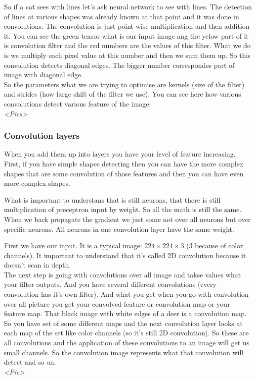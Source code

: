 So if a cat sees with lines let's ask neural network to see with lines. The detection of lines at various shapes was already known at that point and it was done in convolutions. The convolution is just point wise multiplication and then addition it. You can see the green tensor what is our input image ang the yelow part of it is convolution filter and the red numbers are the values of this filter. What we do is we multiply each pixel value at this number and then we sum them up. So this convolution detects diagonal edges. The bigger number correspondes part of image with diagonal edge.\\
So the parameters what we are trying to optimise are kernels (size of the filter) and strides (how large shift of the filter we use). You can see here how various convolutions detect various feature of the image:\\
{\it <Pics>}\\

\subsubsection*{Convolution layers}

When you add them up into layers you have your level of feature increasing. First, if you have simple shapes detecting then you can have the more complex shapes that are some convolution of those features and then you can have even more complex shapes.

What is important to understans that is still neurons, that there is still multiplication of preceptron input by weight. So all the math is still the same. When we back propagate the gradient we just some not over all neurons but over specific neurons. All neurons in one convolution layer have the same weight.

First we have our input. It is a typical image: $224\times224\times3$ (3 because of color channels). It important to understand that it's called 2D convolution because it doesn't scan in depth.\\
The next step is going with convolutions over all image and takse values what your filter outputs. And you have several different convolutions (every convolution has it's own filter). And what you get when you go with convolution over all picture you get your convolved feature or convolution map or your feature map. That black image with white edges of a deer is a convolution map. So you have set of some different maps and the next convolution layer looks at each map of the set like color channels (so it's still 2D convolution). So these are all convolutions and the application of these convolutions to an image will get us small channels. So the convolution image represents what that convolution will detect and so on.\\
{\it <Pic>}


